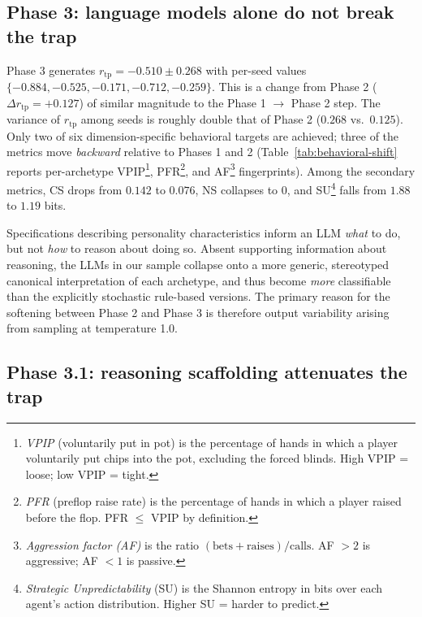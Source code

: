 \documentclass[10pt]{article} %
\newcommand{\rtp}{\ensuremath{r_{\mathrm{tp}}}}
\begin{document}

\subsection{Phase 3: language models alone do not break the trap}

Phase 3 generates $\rtp = -0.510 \pm 0.268$ with per-seed values
$\{-0.884, -0.525, -0.171, -0.712, -0.259\}$. This is a change from
Phase 2 ($\Delta\rtp = +0.127$) of similar magnitude to the
Phase 1 $\to$ Phase 2 step. The variance of $\rtp$ among seeds is
roughly double that of Phase 2 ($0.268$ vs.\ $0.125$). Only two of
six dimension-specific behavioral targets are achieved; three of the
metrics move \textit{backward} relative to
Phases 1 and 2 (Table~\ref{tab:behavioral-shift} reports
per-archetype VPIP\footnote{\textit{VPIP} (voluntarily put in
pot) is the percentage of hands in which a player voluntarily
put chips into the pot, excluding the forced blinds. High VPIP =
loose; low VPIP = tight.},
PFR\footnote{\textit{PFR} (preflop raise rate) is the percentage
of hands in which a player raised before the flop. PFR $\le$
VPIP by definition.}, and
AF\footnote{\textit{Aggression factor (AF)} is the ratio
$(\text{bets}+\text{raises})/\text{calls}$. AF $>2$ is
aggressive; AF $<1$ is passive.} fingerprints). Among the secondary
metrics, CS drops from $0.142$ to $0.076$, NS collapses to $0$, and
SU\footnote{\textit{Strategic Unpredictability} (SU) is the
Shannon entropy in bits over each agent's action distribution.
Higher SU = harder to predict.} falls from $1.88$ to $1.19$
bits.



Specifications describing personality characteristics inform an LLM
\textit{what} to do, but not \textit{how} to reason about doing so.
Absent supporting information about reasoning, the LLMs in our sample
collapse onto a more generic, stereotyped canonical interpretation
of each archetype, and thus become \textit{more} classifiable than
the explicitly stochastic rule-based versions. The primary reason
for the softening between Phase 2 and Phase 3 is therefore output
variability arising from sampling at temperature 1.0.


\subsection{Phase 3.1: reasoning scaffolding attenuates the trap}
\end{document}
